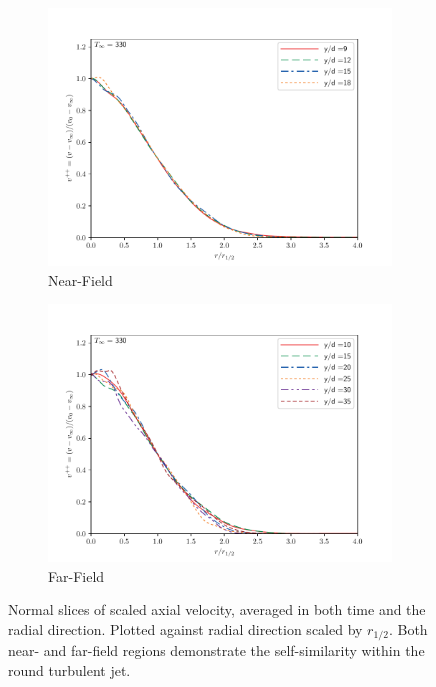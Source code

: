 \begin{figure}[htbp!]
\begin{center}
\begin{subfigure}{0.45\textwidth}
	\includegraphics[scale=.45]{figures/Plots/radial/slices_3/same_ambient/r_vs_v.pdf}
	\caption{Near-Field} \label{330_r_vs_v_1}
\end{subfigure}
\begin{subfigure}{0.45\textwidth}
	\includegraphics[scale=.45]{figures/Plots/radial/slices_5/same_ambient/r_vs_v.pdf}
	\caption{Far-Field} \label{330_r_vs_v_2}
\end{subfigure}
\caption{Normal slices of scaled axial velocity, averaged in both time and the radial direction. Plotted against radial direction scaled by $r_{1/2}$. Both near- and far-field regions demonstrate the self-similarity within the round turbulent jet.}
\label{330_r_v_features}
\end{center}
\end{figure}

